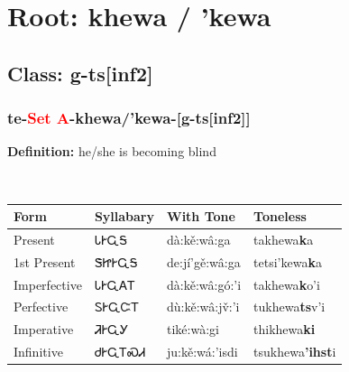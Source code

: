 \needspace{4in}
\section*{Root: khewa / 'kewa}
\nopagebreak
{}
\needspace{3in}
\subsection*{Class: g-ts[inf2]}
\nopagebreak
\needspace{2in}
\subsubsection*{te{-}\textcolor{Red}{Set A}{-}\textbf{khewa/'kewa}{-}[g-ts[inf2]]}
\nopagebreak
\textbf{Definition: } he/she is becoming blind
\\[0.5em]
\begin{tabularx}{\textwidth}{l X X X}%
\toprule%
\textbf{Form}&\textbf{Syllabary}&\textbf{With Tone}&\textbf{Toneless}\\%
\midrule%
Present&ᏓᎨᏩᎦ&dà:kě:wâ:ga&takhewa\textbf{k}a\\%
1st Present&ᏕᏥᎨᏩᎦ&de:jí’gě:wâ:ga&tetsi'kewa\textbf{k}a\\%
Imperfective&ᏓᎨᏩᎪᎢ&dà:kě:wâ:gó:’i&takhewa\textbf{k}o'i\\%
Perfective&ᏚᎨᏩᏨᎢ&dù:kě:wâ:jv̌:’i&tukhewa\textbf{ts}v'i\\%
Imperative&ᏘᎨᏩᎩ&tiké:wà:gi&thikhewa\textbf{ki}\\%
Infinitive&ᏧᎨᏩᎢᏍᏗ&ju:kě:wá:’isdi&tsukhewa\textbf{'ihst}i\\%
\bottomrule%
\end{tabularx}
\\[1em]